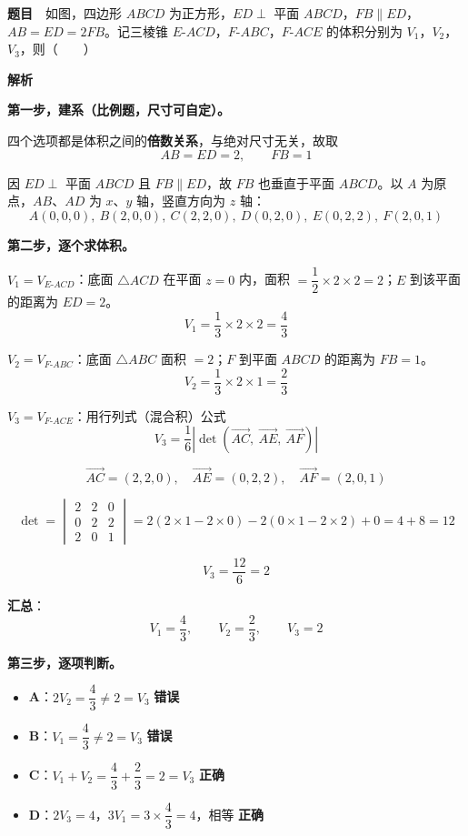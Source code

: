 \par\medskip


\textbf{题目}　如图，四边形 $ABCD$ 为正方形，$ED\perp$ 平面 $ABCD$，$FB\parallel ED$，$AB=ED=2FB$。记三棱锥 $E\text{-}ACD$，$F\text{-}ABC$，$F\text{-}ACE$ 的体积分别为 $V_1$，$V_2$，$V_3$，则（　　）

\begin{center}\end{center}

\textbf{解析}

\textbf{第一步，建系（比例题，尺寸可自定）。}

四个选项都是体积之间的\textbf{倍数关系}，与绝对尺寸无关，故取
\[AB=ED=2,\qquad FB=1\]

因 $ED\perp$ 平面 $ABCD$ 且 $FB\parallel ED$，故 $FB$ 也垂直于平面 $ABCD$。以 $A$ 为原点，$AB$、$AD$ 为 $x$、$y$ 轴，竖直方向为 $z$ 轴：
\[A(0,0,0),\ B(2,0,0),\ C(2,2,0),\ D(0,2,0),\ E(0,2,2),\ F(2,0,1)\]

\textbf{第二步，逐个求体积。}

\textbf{$V_1=V_{E\text{-}ACD}$}：底面 $\triangle ACD$ 在平面 $z=0$ 内，面积 $=\dfrac12\times2\times2=2$；$E$ 到该平面的距离为 $ED=2$。
\[V_1=\frac13\times2\times2=\frac43\]

\textbf{$V_2=V_{F\text{-}ABC}$}：底面 $\triangle ABC$ 面积 $=2$；$F$ 到平面 $ABCD$ 的距离为 $FB=1$。
\[V_2=\frac13\times2\times1=\frac23\]

\textbf{$V_3=V_{F\text{-}ACE}$}：用行列式（混合积）公式
\[V_3=\frac16\left|\det\left(\overrightarrow{AC},\ \overrightarrow{AE},\ \overrightarrow{AF}\right)\right|\]

\[\overrightarrow{AC}=(2,2,0),\quad\overrightarrow{AE}=(0,2,2),\quad\overrightarrow{AF}=(2,0,1)\]

\[\det=\begin{vmatrix}2&2&0\\0&2&2\\2&0&1\end{vmatrix}=2(2\times1-2\times0)-2(0\times1-2\times2)+0=4+8=12\]

\[V_3=\frac{12}6=2\]

\textbf{汇总}：
\[V_1=\frac43,\qquad V_2=\frac23,\qquad V_3=2\]

\textbf{第三步，逐项判断。}

\begin{itemize}
\item \textbf{A}：$2V_2=\dfrac43\ne2=V_3$  \textbf{错误}
\item \textbf{B}：$V_1=\dfrac43\ne2=V_3$  \textbf{错误}
\item \textbf{C}：$V_1+V_2=\dfrac43+\dfrac23=2=V_3$  \textbf{正确}
\item \textbf{D}：$2V_3=4$，$3V_1=3\times\dfrac43=4$，相等  \textbf{正确}
\end{itemize}

